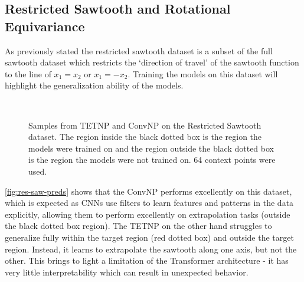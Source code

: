 \documentclass[../../main.tex]{subfiles}
\begin{document}
\subsection{Restricted Sawtooth and Rotational Equivariance}

As previously stated the restricted sawtooth dataset is a subset of the full sawtooth dataset which restricts the `direction of travel' of the sawtooth function to the line of $x_1 = x_2$ or $x_1 = -x_2$. Training the models on this dataset will highlight the generalization ability of the models.

\begin{figure}[H]
    \centering
    \\
    \caption{Samples from TETNP and ConvNP on the Restricted Sawtooth dataset. The region inside the black dotted box is the region the models were trained on and the region outside the black dotted box is the region the models were not trained on. 64 context points were used.}
    \label{fig:res-saw-preds}
\end{figure}

\autoref{fig:res-saw-preds} shows that the ConvNP performs excellently on this dataset, which is expected as CNNs use filters to learn features and patterns in the data explicitly, allowing them to perform excellently on extrapolation tasks (outside the black dotted box region). The TETNP on the other hand struggles to generalize fully within the target region (red dotted box) and outside the target region. Instead, it learns to extrapolate the sawtooth along one axis, but not the other. This brings to light a limitation of the Transformer architecture - it has very little interpretability which can result in unexpected behavior.
\end{document}
